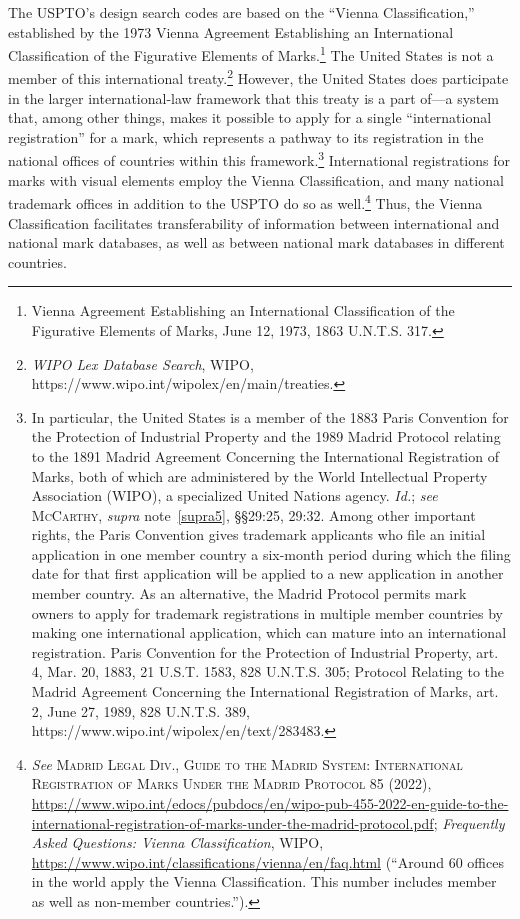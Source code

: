 \documentclass[letterpaper, 11pt, oneside]{article}
\begin{document}
The USPTO's design search codes are based on the ``Vienna Classification,'' established by the 1973 Vienna Agreement Establishing an International Classification of the Figurative Elements of Marks.\footnote{Vienna Agreement Establishing an International Classification of the Figurative Elements of Marks, June 12, 1973, 1863 U.N.T.S. 317.} The United States is not a member of this international treaty.\footnote{\textit{WIPO Lex Database Search}, WIPO, https://www.wipo.int/wipolex/en/main/treaties.} However, the United States does participate in the larger international-law framework that this treaty is a part of—a system that, among other things, makes it possible to apply for a single ``international registration'' for a mark, which represents a pathway to its registration in the national offices of countries within this framework.\footnote{In particular, the United States is a member of the 1883 Paris Convention for the Protection of Industrial Property and the 1989 Madrid Protocol relating to the 1891 Madrid Agreement Concerning the International Registration of Marks, both of which are administered by the World Intellectual Property Association (WIPO), a specialized United Nations agency. \textit{Id.}; \textit{see} \textsc{McCarthy}, \textit{supra} note~\ref{supra5}, \S\S 29:25, 29:32. Among other important rights, the Paris Convention gives trademark applicants who file an initial application in one member country a six-month period during which the filing date for that first application will be applied to a new application in another member country. As an alternative, the Madrid Protocol permits mark owners to apply for trademark registrations in multiple member countries by making one international application, which can mature into an international registration. Paris Convention for the Protection of Industrial Property, art. 4, Mar. 20, 1883, 21 U.S.T. 1583, 828 U.N.T.S. 305; Protocol Relating to the Madrid Agreement Concerning the International Registration of Marks, art. 2, June 27, 1989, 828 U.N.T.S. 389, https://www.wipo.int/wipolex/en/text/283483.} International registrations for marks with visual elements employ the Vienna Classification, and many national trademark offices in addition to the USPTO do so as well.\footnote{\textit{See} \textsc{Madrid Legal Div., Guide to the Madrid System: International Registration of Marks Under the Madrid Protocol} 85 (2022), \url{https://www.wipo.int/edocs/pubdocs/en/wipo-pub-455-2022-en-guide-to-the-international-registration-of-marks-under-the-madrid-protocol.pdf}; \textit{Frequently Asked Questions: Vienna Classification}, WIPO, \url{https://www.wipo.int/classifications/vienna/en/faq.html} (``Around 60 offices in the world apply the Vienna Classification. This number includes member as well as non-member countries.'').} Thus, the Vienna Classification facilitates transferability of information between international and national mark databases, as well as between national mark databases in different countries.
\end{document}
